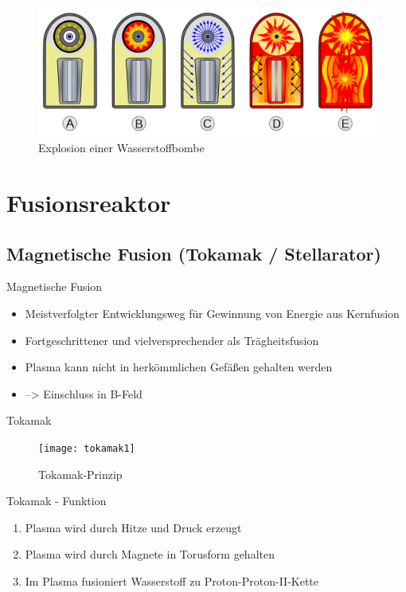 \documentclass[10pt,a4paper, ngerman]{beamer}
\begin{document}
\begin{frame}{\subsecname}{\secname}
\begin{figure}
\centering
\includegraphics[width=\linewidth]{h-bomb-expl}
\caption{Explosion einer Wasserstoffbombe}
\label{fig:h-bomb-expl}
\end{figure}
\end{frame}


\section{Fusionsreaktor}
\subsection[Magnetische Fusion]{Magnetische Fusion (Tokamak / Stellarator)}
\begin{frame}{Magnetische Fusion}{\secname}
\begin{itemize}
\item Meistverfolgter Entwicklungsweg für Gewinnung von Energie aus Kernfusion
\item Fortgeschrittener und vielversprechender als Trägheitsfusion
\pause
\item Plasma kann nicht in herkömmlichen Gefäßen gehalten werden
\item --> Einschluss in B-Feld
\end{itemize}
\end{frame}

\begin{frame}{Tokamak}{\secname}
\begin{figure}
\centering
\texttt{[image: tokamak1]}
\caption{Tokamak-Prinzip}
\label{fig:tokamak1}
\end{figure}
\end{frame}

\begin{frame}{Tokamak - Funktion}{\secname}
\begin{enumerate}
\item Plasma wird durch Hitze und Druck erzeugt
\item Plasma wird durch Magnete in Torusform gehalten
\item Im Plasma fusioniert Wasserstoff zu Proton-Proton-II-Kette
\end{enumerate}
\end{frame}
\end{document}
